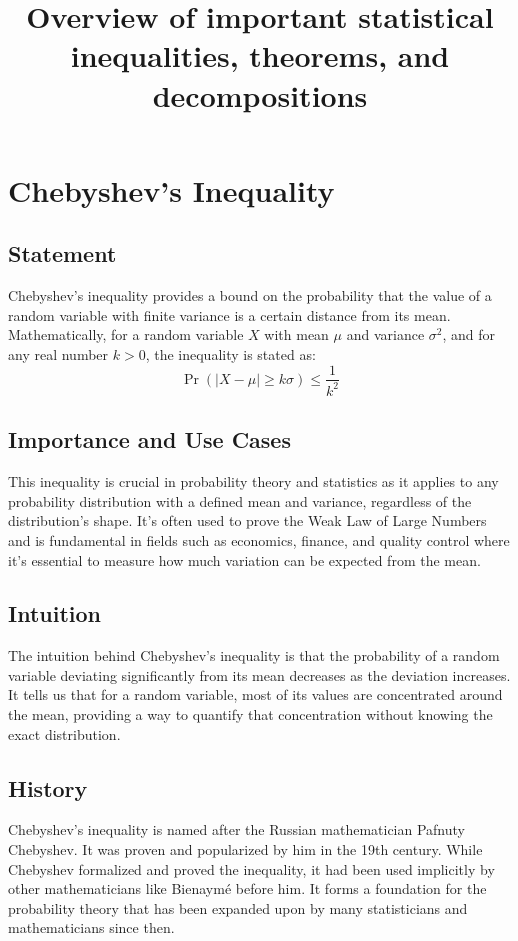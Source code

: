 \documentclass{article}
\title{Overview of important statistical inequalities, theorems, and decompositions}
\author{}
\date{}
\begin{document}
\tableofcontents
\maketitle
\section{Chebyshev's Inequality}

\subsection{Statement}
Chebyshev's inequality provides a bound on the probability that the value of a random variable with finite variance is a certain distance from its mean. Mathematically, for a random variable \( X \) with mean \( \mu \) and variance \( \sigma^2 \), and for any real number \( k > 0 \), the inequality is stated as:
\[ \Pr(|X - \mu| \geq k\sigma) \leq \frac{1}{k^2} \]

\subsection{Importance and Use Cases}
This inequality is crucial in probability theory and statistics as it applies to any probability distribution with a defined mean and variance, regardless of the distribution's shape. It's often used to prove the Weak Law of Large Numbers and is fundamental in fields such as economics, finance, and quality control where it's essential to measure how much variation can be expected from the mean.

\subsection{Intuition}
The intuition behind Chebyshev's inequality is that the probability of a random variable deviating significantly from its mean decreases as the deviation increases. It tells us that for a random variable, most of its values are concentrated around the mean, providing a way to quantify that concentration without knowing the exact distribution.

\subsection{History}
Chebyshev's inequality is named after the Russian mathematician Pafnuty Chebyshev. It was proven and popularized by him in the 19th century. While Chebyshev formalized and proved the inequality, it had been used implicitly by other mathematicians like Bienaymé before him. It forms a foundation for the probability theory that has been expanded upon by many statisticians and mathematicians since then.
\end{document}
